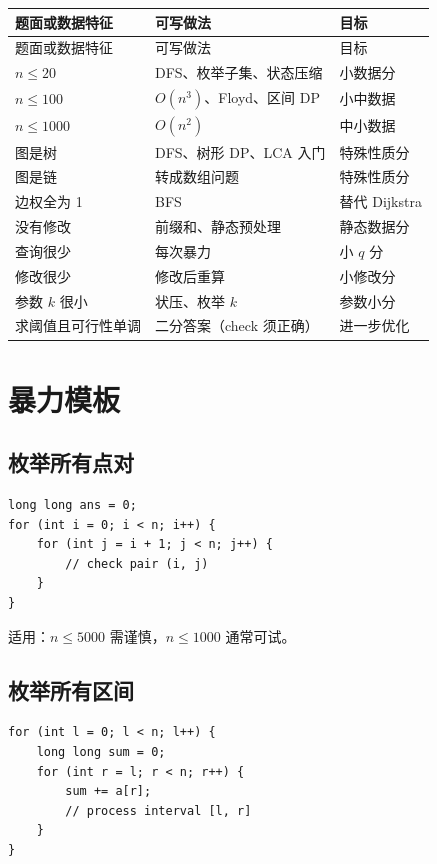 \begin{longtable}{p{4.5cm}p{5cm}p{4.5cm}}
\toprule
题面或数据特征 & 可写做法 & 目标 \\
\midrule
\endfirsthead
\toprule
题面或数据特征 & 可写做法 & 目标 \\
\midrule
\endhead
$n \le 20$ & DFS、枚举子集、状态压缩 & 小数据分 \\
$n \le 100$ & $O(n^3)$、Floyd、区间 DP & 小中数据 \\
$n \le 1000$ & $O(n^2)$ & 中小数据 \\
图是树 & DFS、树形 DP、LCA 入门 & 特殊性质分 \\
图是链 & 转成数组问题 & 特殊性质分 \\
边权全为 1 & BFS & 替代 Dijkstra \\
没有修改 & 前缀和、静态预处理 & 静态数据分 \\
查询很少 & 每次暴力 & 小 $q$ 分 \\
修改很少 & 修改后重算 & 小修改分 \\
参数 $k$ 很小 & 状压、枚举 $k$ & 参数小分 \\
求阈值且可行性单调 & 二分答案（check 须正确） & 进一步优化 \\
\bottomrule
\end{longtable}

\section{暴力模板}\label{sec:08-4}

\subsection{枚举所有点对}

\begin{lstlisting}
long long ans = 0;
for (int i = 0; i < n; i++) {
    for (int j = i + 1; j < n; j++) {
        // check pair (i, j)
    }
}
\end{lstlisting}

适用：$n \le 5000$ 需谨慎，$n \le 1000$ 通常可试。

\subsection{枚举所有区间}

\begin{lstlisting}
for (int l = 0; l < n; l++) {
    long long sum = 0;
    for (int r = l; r < n; r++) {
        sum += a[r];
        // process interval [l, r]
    }
}
\end{lstlisting}

